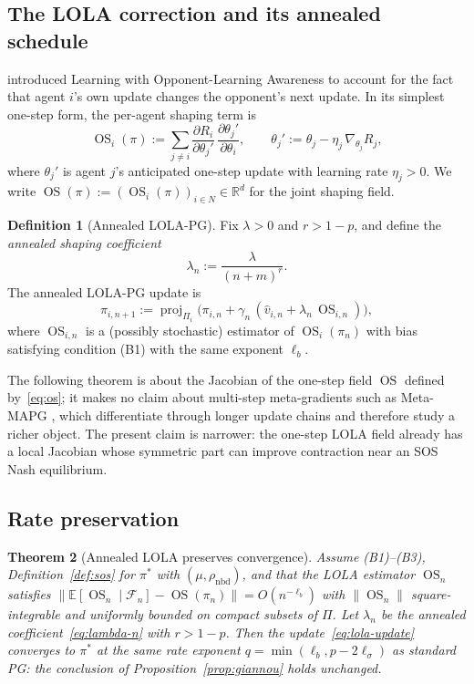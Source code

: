 \documentclass{article}
\theoremstyle{plain}
\newtheorem{theorem}{Theorem}[section]
\theoremstyle{definition}
\newtheorem{definition}[theorem]{Definition}
\theoremstyle{remark}
\newcommand{\E}{\mathbb{E}}
\newcommand{\proj}{\operatorname{proj}}
\DeclareMathOperator{\OS}{OS}
\begin{document}
\subsection{The LOLA correction and its annealed schedule}

\citet{foerster2018lola} introduced Learning with Opponent-Learning Awareness to account for the fact that agent $i$'s own update changes the opponent's next update. In its simplest one-step form, the per-agent shaping term is
\begin{equation}\label{eq:os}
\OS_i(\pi) := \sum_{j\neq i}\frac{\partial R_i}{\partial \theta_j'}\,\frac{\partial \theta_j'}{\partial \theta_i}, \qquad \theta_j' := \theta_j - \eta_j\,\nabla_{\theta_j}R_j,
\end{equation}
where $\theta_j'$ is agent $j$'s anticipated one-step update with learning rate $\eta_j>0$. We write $\OS(\pi) := (\OS_i(\pi))_{i\in N}\in\mathbb{R}^d$ for the joint shaping field.

\begin{definition}[Annealed LOLA-PG]\label{def:lolapg}
Fix $\lambda>0$ and $r>1-p$, and define the \emph{annealed shaping coefficient}
\begin{equation}\label{eq:lambda-n}
\lambda_n := \frac{\lambda}{(n+m)^r}.
\end{equation}
The annealed LOLA-PG update is
\begin{equation}\label{eq:lola-update}
\pi_{i,n+1} := \proj_{\Pi_i}\!\bigl(\pi_{i,n} + \gamma_n\,(\hat v_{i,n} + \lambda_n\,\OS_{i,n})\bigr),
\end{equation}
where $\OS_{i,n}$ is a (possibly stochastic) estimator of $\OS_i(\pi_n)$ with bias satisfying condition (B1) with the same exponent $\ell_b$.
\end{definition}

The following theorem is about the Jacobian of the one-step field $\OS$ defined by~\eqref{eq:os}; it makes no claim about multi-step meta-gradients such as Meta-MAPG \citep{kim2021meta}, which differentiate through longer update chains and therefore study a richer object. The present claim is narrower: the one-step LOLA field already has a local Jacobian whose symmetric part can improve contraction near an SOS Nash equilibrium.

\subsection{Rate preservation}

\begin{theorem}[Annealed LOLA preserves convergence]\label{thm:lola-rate}
Assume \textup{(B1)--(B3)}, Definition~\ref{def:sos} for $\pi^\ast$ with $(\mu,\rho_{\mathrm{nbd}})$, and that the LOLA estimator $\OS_n$ satisfies $\|\E[\OS_n\mid\mathcal{F}_n] - \OS(\pi_n)\|=O(n^{-\ell_b})$ with $\|\OS_n\|$ square-integrable and uniformly bounded on compact subsets of $\Pi$. Let $\lambda_n$ be the annealed coefficient~\eqref{eq:lambda-n} with $r>1-p$. Then the update~\eqref{eq:lola-update} converges to $\pi^\ast$ at the same rate exponent $q=\min(\ell_b,p-2\ell_\sigma)$ as standard PG: the conclusion of Proposition~\ref{prop:giannou} holds unchanged.
\end{theorem}
\end{document}
